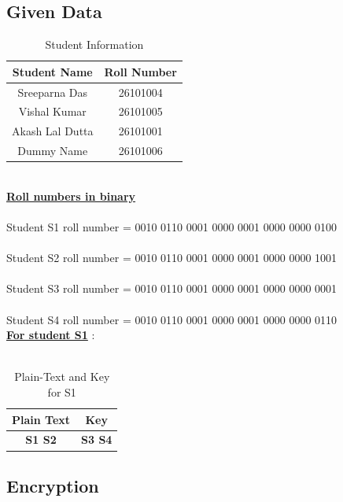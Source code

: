 \documentclass[12pt, letterpaper]{article}
\begin{document}
\subsection{Given Data}

\begin{table}[h]
    \centering
    \begin{tabular}{|c|c|}
        \hline
        \textbf{Student Name} & \textbf{Roll Number} \\
        \hline
        Sreeparna Das & 26101004 \\
        \hline
        Vishal Kumar & 26101005 \\
        \hline
        Akash Lal Dutta & 26101001 \\
        \hline
        Dummy Name & 26101006 \\
        \hline
    \end{tabular}
    \caption{Student Information}
    \label{tab:student-info}
\end{table} \\

\underline{\textbf{Roll numbers in binary}}\\
\\
Student S1 roll number = 0010 0110 0001 0000 0001 0000 0000 0100\\
\\
Student S2 roll number = 0010 0110 0001 0000 0001 0000 0000 1001\\
\\
Student S3 roll number = 0010 0110 0001 0000 0001 0000 0000 0001\\
\\
Student S4 roll number = 0010 0110 0001 0000 0001 0000 0000 0110\\

\underline{\textbf{For student S1}} : \\
\\

\begin{table}[h]
    \centering
    \begin{tabular}{|c|c|}
        \hline
          Plain Text & Key \\
        \hline
        \textbf{S1 S2} & \textbf{S3 S4} \\
        \hline
    \end{tabular}
    \caption{Plain-Text and Key for S1}
    \label{tab:text-key}
\end{table}

\subsection{Encryption}
\end{document}
